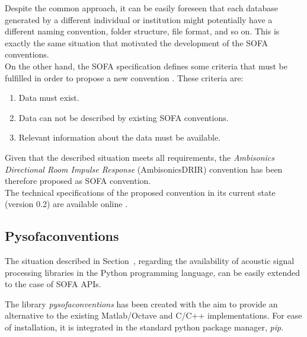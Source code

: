 Despite the common approach, it can be easily foreseen that each database generated by a different individual or institution might potentially have a different naming convention, folder structure, file format, and so on. 
This is exactly the same situation that motivated the development of the SOFA conventions. \\

On the other hand, the SOFA specification defines some criteria that must be fulfilled in order to propose a new convention \cite{sofaconventions}. These criteria are:
\begin{enumerate}
    \item Data must exist.
    \item Data can not be described by existing SOFA conventions.
    \item Relevant information about the data must be available.
\end{enumerate} 

Given that the described situation meets all requirements, the \textit{Ambisonics Directional Room Impulse Response} (AmbisonicsDRIR) convention has been therefore proposed as SOFA convention.\\

The technical specifications of the proposed convention in its current state (version 0.2) are available online \cite{ambisonicsdrir}. 


\subsection{Pysofaconventions}

The situation described in Section~\label{sec:intro_data}, regarding the availability of acoustic signal processing libraries in the Python programming language, can be easily extended to the case of SOFA APIs.
 
The library \textit{pysofaconventions} has been created with the aim to provide an alternative to the existing Matlab/Octave and C/C++ implementations. 
For ease of installation, it is integrated in the standard python package manager, \textit{pip}. 

